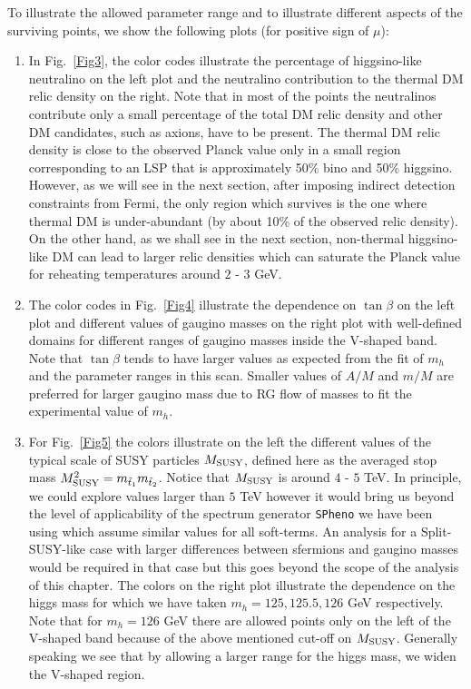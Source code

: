 \documentclass[12pt,a4paper]{book}
\begin{document}
To illustrate the allowed parameter range and to illustrate different aspects of the surviving points, we show the following plots (for positive sign of $\mu$):
\begin{enumerate}
\item In Fig.~\ref{Fig3}, the color codes illustrate the percentage of higgsino-like neutralino on the left plot and the neutralino contribution to the thermal DM relic density on the right. Note that in most of the points the neutralinos contribute only a small percentage of the total DM relic density and other DM candidates, such as axions, have to be present. The thermal DM relic density is close to the observed Planck value only in a small region corresponding to an LSP that is approximately 50\% bino and 50\% higgsino. However, as we will see in the next section, after imposing indirect detection constraints from Fermi, the only region which survives is the one where thermal DM is under-abundant (by about 10\% of the observed relic density). On the other hand, as we shall see in the next section, non-thermal higgsino-like DM can lead to larger relic densities which can saturate the Planck value for reheating temperatures around $2$ - $3$ GeV.

\item The color codes in Fig.~\ref{Fig4} illustrate the dependence on $\tan\beta$ on the left plot and different values of gaugino masses on the right plot with well-defined domains for different ranges of gaugino masses inside the V-shaped band. Note that $\tan\beta$ tends to have larger values as expected from the fit of $m_h$ and the parameter ranges in this scan. Smaller values of $A/M$ and $m/M$ are preferred for larger gaugino mass due to RG flow of masses to fit the experimental value of $m_h$.

\item For Fig.~\ref{Fig5} the colors illustrate on the left the different values of the typical scale of SUSY particles $M_{\rm SUSY}$, defined here as the averaged stop mass $M_{\rm SUSY}^2=m_{\tilde{t}_1} m_{\tilde{t}_2}$. Notice that $M_{\rm SUSY}$ is around $4$ - $5$ TeV. In principle, we could explore values larger than $5$ TeV however it would bring us beyond the level of applicability of the spectrum generator \verb"SPheno" we have been using which assume similar values for all soft-terms. An analysis for a Split-SUSY-like case with larger differences between sfermions and gaugino masses would be required in that case but this goes beyond the scope of the analysis of this chapter. The colors on the right plot illustrate the dependence on the higgs mass for which we have taken $m_h=125, 125.5, 126$ GeV respectively. Note that for $m_h=126$ GeV there are allowed points only on the left of the V-shaped band because of the above mentioned cut-off on $M_{\rm SUSY}$. Generally speaking we see that by allowing a larger 
range for the higgs mass, we widen the V-shaped region. 
\end{enumerate}
\end{document}

